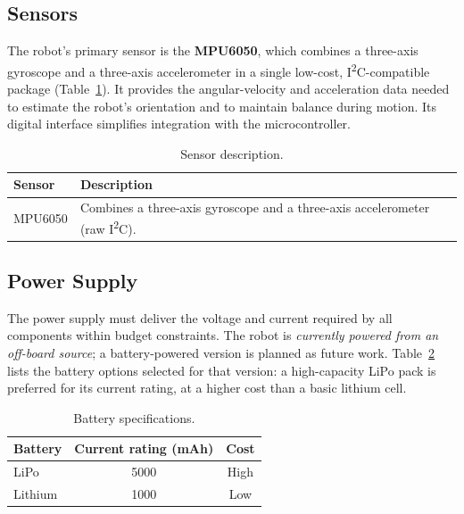\subsection{Sensors}
The robot's primary sensor is the \textbf{MPU6050}, which combines a
three-axis gyroscope and a three-axis accelerometer in a single
low-cost, I\textsuperscript{2}C-compatible package
(Table~\ref{tab:sensor}). It provides the angular-velocity and
acceleration data needed to estimate the robot's orientation and to
maintain balance during motion. Its digital interface simplifies
integration with the microcontroller.

\begin{table}[ht]
  \centering
  \caption{Sensor description.}
  \label{tab:sensor}
  \small
  \renewcommand{\arraystretch}{1.2}
  \begin{tabularx}{0.7\textwidth}{@{}lX@{}}
    \toprule
    \textbf{Sensor} & \textbf{Description} \\
    \midrule
    MPU6050 & Combines a three-axis gyroscope and a three-axis
              accelerometer (raw I\textsuperscript{2}C). \\
    \bottomrule
  \end{tabularx}
\end{table}

\subsection{Power Supply}
The power supply must deliver the voltage and current required by all
components within budget constraints. The robot is \emph{currently
powered from an off-board source}; a battery-powered version is planned
as future work. Table~\ref{tab:battery} lists the battery options
selected for that version: a high-capacity LiPo pack is preferred for its
current rating, at a higher cost than a basic lithium cell.

\begin{table}[ht]
  \centering
  \caption{Battery specifications.}
  \label{tab:battery}
  \small
  \renewcommand{\arraystretch}{1.2}
  \begin{tabular}{@{}lcc@{}}
    \toprule
    \textbf{Battery} & \textbf{Current rating (mAh)} & \textbf{Cost} \\
    \midrule
    LiPo    & 5000 & High \\
    Lithium & 1000 & Low  \\
    \bottomrule
  \end{tabular}
\end{table}

